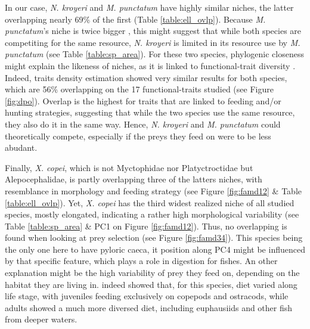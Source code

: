 In our case, \textit{N. kroyeri} and \textit{M. punctatum} have highly similar niches, the latter overlapping nearly 69\% of the first (Table \ref{table:ell_ovlp}). Because \textit{M. punctatum}'s niche is twice bigger , this might suggest that while both species are competiting for the same resource, \textit{N. kroyeri} is limited in its resource use by \textit{M. punctatum} (see Table \ref{table:sp_area}). For these two species, phylogenic closeness might explain the likeness of niches, as it is linked to functional-trait diversity \citep{tucker2018}. Indeed, traits density estimation showed very similar results for both species, which are 56\% overlapping on the 17 functional-traits studied (see Figure \ref{fig:dpo}). Overlap is the highest for traits that are linked to feeding and/or hunting strategies, suggesting that while the two species use the same resource, they also do it in the same way. Hence, \textit{N. kroyeri} and \textit{M. punctatum} could theoretically compete, especially if the preys they feed on were to be less abudant. 

Finally, \textit{X. copei}, which is not Myctophidae nor Platyctroctidae but Alepocephalidae, is partly overlapping three of the latters niches, with resemblance in morphology and feeding strategy (see Figure \ref{fig:famd12} \& Table \ref{table:ell_ovlp}). Yet, \textit{X. copei} has the third widest realized niche of all studied species, mostly elongated, indicating a rather high morphological variability (see Table \ref{table:sp_area} \& PC1 on Figure \ref{fig:famd12}). Thus, no overlapping is found when looking at prey selection (see Figure \ref{fig:famd34}). This species being the only one here to have pyloric caeca, it position along PC4 might be influenced by that specific feature, which plays a role in digestion for fishes. An other explanation might be the high variability of prey they feed on, depending on the habitat they are living in. \citet{mauchline1983} indeed showed that, for this species, diet varied along life stage, with juveniles feeding exclusively on copepods and ostracods, while adults showed a much more diversed diet, including euphausiids and other fish from deeper waters. 

